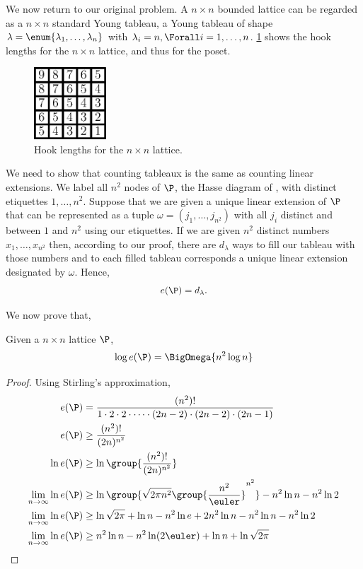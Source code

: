 We now return to our original problem. A \( n \times n \) bounded lattice can be regarded as a \( n \times n \)
standard Young tableau, \ie a Young tableau of shape
\( \lambda = \enum{ \lambda_1 , \ldots , \lambda_n } \)
with
\( \lambda_i = n, \Forall i = 1, \ldots, n \).
\ref{fig:xy:lattice:xyhooks} shows the hook lengths
for the \( n \times n \) lattice, and thus for the \XY poset.
\begin{figure}
\centering
\includegraphics[width=0.24\textwidth]{fig/x+y/lattice/xyhooks}
\caption{Hook lengths for the \( n \times n \) lattice.}
\label{fig:xy:lattice:xyhooks}
\end{figure}
We need to show that counting tableaux is the same as counting linear
extensions. We label all \( n^2 \) nodes of \(\P\), the Hasse diagram of
\XY, with distinct etiquettes \(1,\ldots,n^2\). Suppose that we are
given a unique linear extension of \(\P\) that can be represented as a tuple
\( \omega = ( j_1 , \ldots , j_{n^2}) \)
with all \( j_i \) distinct and between \(1\) and \( n^2 \) using our
etiquettes. If we are given \( n^2 \) distinct numbers \( x_1,\ldots,x_{n^2} \)
then, according to our proof, there are \( d_{\lambda} \) ways to
fill our tableau with those numbers and to each filled tableau corresponds a
unique linear extension designated by \(\omega\). Hence,
\begin{displaymath}
e(\P) = d_{\lambda}.
\end{displaymath}

We now prove that,
\begin{theorem}
Given a \( n \times n \) lattice \(\P\),
\begin{displaymath}
\log e(\P) = \BigOmega{n^2 \log n}
\end{displaymath}
\end{theorem}

\begin{proof}
Using Stirling's approximation,
\begin{align*}
e(\P) &= \frac{(n^2)!}{1 \cdot 2 \cdot 2 \cdot \cdots \cdot (2n-2) \cdot (2n-2) \cdot (2n-1)}\\
e(\P) &\ge \frac{(n^2)!}{(2n)^{n^2}}\\
\ln e(\P) &\ge \ln \group{\frac{(n^2)!}{(2n)^{n^2}}}\\
\lim_{n \to \infty} \ln e(\P) &\ge \ln{\group{\sqrt{2 \pi n^2}
\group{\frac{n^2}{\euler}}^{n^2}}}  - n^2 \ln n - n^2 \ln 2\\
\lim_{n \to \infty} \ln e(\P) &\ge \ln{\sqrt{2\pi}} + \ln n - n^2 \ln e + 2 n^2
\ln n - n^2 \ln n - n^2 \ln 2\\
\lim_{n \to \infty} \ln e(\P) &\ge n^2 \ln n - n^2 \ln (2\euler) + \ln n + \ln \sqrt{2\pi}
\end{align*}
\end{proof}

